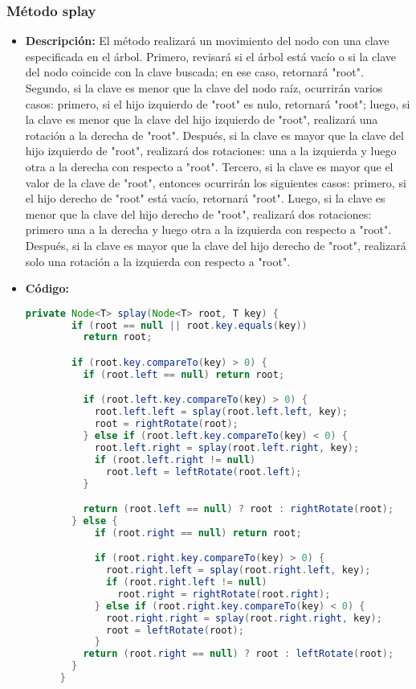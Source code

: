 \documentclass{article}
\begin{document}
  \subsubsection{Método splay}
  \begin{itemize}
    \item \textbf{Descripción: }El método realizará un movimiento del nodo con una clave especificada en el árbol. Primero, 
    revisará si el árbol está vacío o si la clave del nodo coincide con la clave buscada; en ese caso, retornará "root". Segundo, 
    si la clave es menor que la clave del nodo raíz, ocurrirán varios casos: primero, si el hijo izquierdo de "root" es nulo, retornará 
    "root"; luego, si la clave es menor que la clave del hijo izquierdo de "root", realizará una rotación a la derecha de "root". Después, 
    si la clave es mayor que la clave del hijo izquierdo de "root", realizará dos rotaciones: una a la izquierda y luego otra a la derecha 
    con respecto a "root".
    \newline
    Tercero, si la clave es mayor que el valor de la clave de "root", entonces ocurrirán los siguientes casos: primero, si el hijo 
    derecho de "root" está vacío, retornará "root". Luego, si la clave es menor que la clave del hijo derecho de "root", realizará 
    dos rotaciones: primero una a la derecha y luego otra a la izquierda con respecto a "root". Después, si la clave es mayor que la 
    clave del hijo derecho de "root", realizará solo una rotación a la izquierda con respecto a "root".

    \item \textbf{Código: }
    \begin{lstlisting}[language=Java, caption={Método leftRotate}]
      private Node<T> splay(Node<T> root, T key) {
        if (root == null || root.key.equals(key))
          return root;

        if (root.key.compareTo(key) > 0) {
          if (root.left == null) return root;

          if (root.left.key.compareTo(key) > 0) {
            root.left.left = splay(root.left.left, key);
            root = rightRotate(root);
          } else if (root.left.key.compareTo(key) < 0) {
            root.left.right = splay(root.left.right, key);
            if (root.left.right != null)
              root.left = leftRotate(root.left);
          }

          return (root.left == null) ? root : rightRotate(root);
        } else {
            if (root.right == null) return root;

            if (root.right.key.compareTo(key) > 0) {
              root.right.left = splay(root.right.left, key);
              if (root.right.left != null)
                root.right = rightRotate(root.right);
            } else if (root.right.key.compareTo(key) < 0) {
              root.right.right = splay(root.right.right, key);
              root = leftRotate(root);
            }
          return (root.right == null) ? root : leftRotate(root);
        }
      }
    \end{lstlisting}
  \end{itemize}
  
\end{document}
